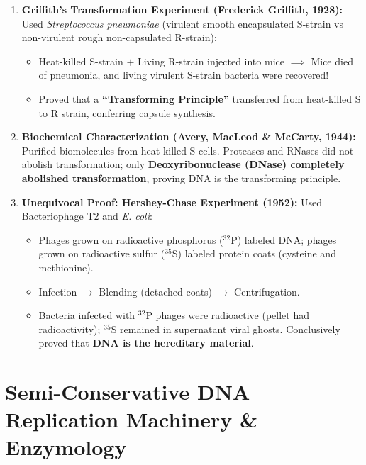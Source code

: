 \documentclass[10pt,twoside,openright]{book}
\begin{document}
\begin{conceptbox}
\begin{enumerate}[leftmargin=*]
  \item \textbf{Griffith's Transformation Experiment (Frederick Griffith, 1928):}
  Used \textit{Streptococcus pneumoniae} (virulent smooth encapsulated S-strain vs non-virulent rough non-capsulated R-strain):
  \begin{itemize}
    \item Heat-killed S-strain $+$ Living R-strain injected into mice $\implies$ Mice died of pneumonia, and living virulent S-strain bacteria were recovered!
    \item Proved that a \textbf{``Transforming Principle''} transferred from heat-killed S to R strain, conferring capsule synthesis.
  \end{itemize}
  \item \textbf{Biochemical Characterization (Avery, MacLeod \& McCarty, 1944):}
  Purified biomolecules from heat-killed S cells. Proteases and RNases did not abolish transformation; only \textbf{Deoxyribonuclease (DNase) completely abolished transformation}, proving DNA is the transforming principle.
  \item \textbf{Unequivocal Proof: Hershey-Chase Experiment (1952):}
  Used Bacteriophage T2 and \textit{E. coli}:
  \begin{itemize}
    \item Phages grown on radioactive phosphorus ($^{32}\mathrm{P}$) labeled DNA; phages grown on radioactive sulfur ($^{35}\mathrm{S}$) labeled protein coats (cysteine and methionine).
    \item Infection $\to$ Blending (detached coats) $\to$ Centrifugation.
    \item Bacteria infected with $^{32}\mathrm{P}$ phages were radioactive (pellet had radioactivity); $^{35}\mathrm{S}$ remained in supernatant viral ghosts. Conclusively proved that \textbf{DNA is the hereditary material}.
  \end{itemize}
\end{enumerate}
\end{conceptbox}

\section{Semi-Conservative DNA Replication Machinery \& Enzymology}
\end{document}
